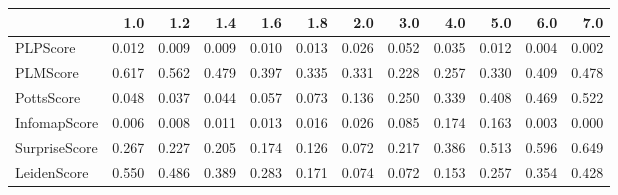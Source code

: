 \begin{tabular}{lrrrrrrrrrrr}
\toprule
{} &   1.0 &   1.2 &   1.4 &   1.6 &   1.8 &   2.0 &   3.0 &   4.0 &   5.0 &   6.0 &   7.0 \\
\midrule
PLPScore      & 0.012 & 0.009 & 0.009 & 0.010 & 0.013 & 0.026 & 0.052 & 0.035 & 0.012 & 0.004 & 0.002 \\
PLMScore      & 0.617 & 0.562 & 0.479 & 0.397 & 0.335 & 0.331 & 0.228 & 0.257 & 0.330 & 0.409 & 0.478 \\
PottsScore    & 0.048 & 0.037 & 0.044 & 0.057 & 0.073 & 0.136 & 0.250 & 0.339 & 0.408 & 0.469 & 0.522 \\
InfomapScore  & 0.006 & 0.008 & 0.011 & 0.013 & 0.016 & 0.026 & 0.085 & 0.174 & 0.163 & 0.003 & 0.000 \\
SurpriseScore & 0.267 & 0.227 & 0.205 & 0.174 & 0.126 & 0.072 & 0.217 & 0.386 & 0.513 & 0.596 & 0.649 \\
LeidenScore   & 0.550 & 0.486 & 0.389 & 0.283 & 0.171 & 0.074 & 0.072 & 0.153 & 0.257 & 0.354 & 0.428 \\
\bottomrule
\end{tabular}
